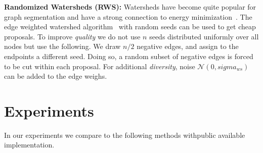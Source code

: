 \documentclass[10pt,twocolumn,letterpaper]{article}
\theoremstyle{definition}
\begin{document}
%

\noindent \textbf{Randomized Watersheds (RWS):}
Watersheds have become quite popular for
graph segmentation and have a strong connection
to energy minimization~\cite{couprie_2011}.
%
The edge weighted watershed algorithm~\cite{meyer_2013}
with random seeds can be used to get
cheap proposals.
To improve \emph{quality} we do not use $n$ seeds distributed uniformly
over all nodes but use the following.
%
We draw $n/2$ negative edges, and assign to the endpoints a different seed.
Doing so, a random subset of negative edges is forced
to be cut within each proposal.
For additional \emph{diversity}, noise $\mathcal{N} (0, sigma_{ws})$
can be added to the edge weighs.

%



\section{Experiments}\label{sec:exp}
In our experiments we compare to the following methods withpublic available implementation.
\end{document}

